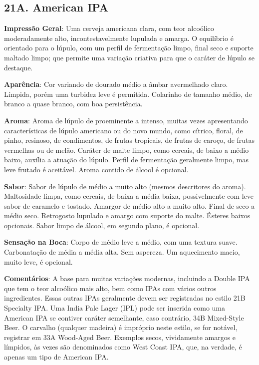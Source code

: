 \subsection*{21A. American IPA}

\textbf{Impressão Geral}: Uma cerveja americana clara, com teor alcoólico moderadamente alto, incontestavelmente lupulada e amarga. O equilíbrio é orientado para o lúpulo, com um perfil de fermentação limpo, final seco e suporte maltado limpo; que permite uma variação criativa para que o caráter de lúpulo se destaque.

\textbf{Aparência}: Cor variando de dourado médio a âmbar avermelhado claro. Límpida, porém uma turbidez leve é permitida. Colarinho de tamanho médio, de branco a quase branco, com boa persistência.

\textbf{Aroma}: Aroma de lúpulo de proeminente a intenso, muitas vezes apresentando características de lúpulo americano ou do novo mundo, como cítrico, floral, de pinho, resinoso, de condimentos, de frutas tropicais, de frutas de caroço, de frutas vermelhas ou de melão. Caráter de malte limpo, como cereais, de baixo a médio baixo, auxília a atuação do lúpulo. Perfil de fermentação geralmente limpo, mas leve frutado é aceitável. Aroma contido de álcool é opcional.

\textbf{Sabor}: Sabor de lúpulo de médio a muito alto (mesmos descritores do aroma). Maltosidade limpa, como cereais, de baixa a média baixa, possivelmente com leve sabor de caramelo e tostado. Amargor de médio alto a muito alto. Final de seco a médio seco. Retrogosto lupulado e amargo com suporte do malte. Ésteres baixos opcionais. Sabor limpo de álcool, em segundo plano, é opcional.

\textbf{Sensação na Boca}: Corpo de médio leve a médio, com uma textura suave. Carbonatação de média a média alta. Sem aspereza. Um aquecimento macio, muito leve, é opcional.

\textbf{Comentários}: A base para muitas variações modernas, incluindo a Double IPA que tem o teor alcoólico mais alto, bem como IPAs com vários outros ingredientes. Essas outras IPAs geralmente devem ser registradas no estilo 21B Specialty IPA. Uma India Pale Lager (IPL) pode ser inserida como uma American IPA se contiver caráter semelhante, caso contrário, 34B Mixed-Style Beer. O carvalho (qualquer madeira) é impróprio neste estilo, se for notável, registrar em 33A Wood-Aged Beer. Exemplos secos, vividamente amargos e límpidos, às vezes são denominados como West Coast IPA, que, na verdade, é apenas um tipo de American IPA.

